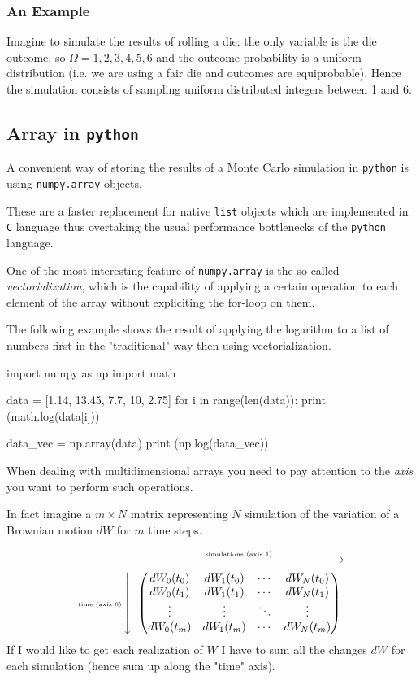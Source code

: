 \documentclass[12pt,a4paper]{book}
\newcommand{\mymatrix}[1]{\ensuremath{\left\downarrow\vphantom{#1}\right.\overset{\xrightarrow[\hphantom{#1}]{\text{simulations (axis 1)}}}{#1}}}
\begin{document}
\subsubsection{An Example}

Imagine to simulate the results of rolling a die: the only variable is the die outcome, so $\Omega =1,2,3,4,5,6$ and the outcome probability is a uniform distribution (i.e. we are using a fair die and outcomes are equiprobable). Hence the simulation consists of sampling uniform distributed integers between 1 and 6.

\subsection{Array in \texttt{python}}

A convenient way of storing the results of a Monte Carlo simulation in \texttt{python} is using \texttt{numpy.array} objects. 

These are a faster replacement for native \texttt{list} objects which are implemented in \texttt{C} language thus overtaking the usual performance bottlenecks of the \texttt{python} language. 

One of the most interesting feature of \texttt{numpy.array} is the so called \emph{vectorialization}, which is the capability of applying a certain operation to each element of the array without expliciting the for-loop on them.

The following example shows the result of applying the logarithm to a list of numbers first in the "traditional" way then using vectorialization.
\begin{ipython}
import numpy as np
import math 

data = [1.14, 13.45, 7.7, 10, 2.75]
for i in range(len(data)):
	print (math.log(data[i]))
	
data_vec = np.array(data)
print (np.log(data_vec))
\end{ipython}

When dealing with multidimensional arrays you need to pay attention to the \emph{axis} you want to perform such operations.

In fact imagine a $m\times N$ matrix representing $N$ simulation of the variation of a Brownian motion $dW$ for $m$ time steps.

\begin{equation}
	\text{\tiny time (axis 0)}\mymatrix{\begin{pmatrix}
			dW_0(t_0) & dW_1(t_0) & \cdots & dW_N(t_0) \\
			dW_0(t_1) & dW_1(t_1) & \cdots & dW_N(t_1) \\
			\vdots  & \vdots  & \ddots & \vdots  \\
			dW_0(t_m) & dW_1(t_m) & \cdots & dW_N(t_m)
	\end{pmatrix}}
\label{numpy_array}
\end{equation}
If I would like to get each realization of $W$ I have to sum all the changes $dW$ for each simulation (hence sum up along the "time" axis). 
\end{document}
